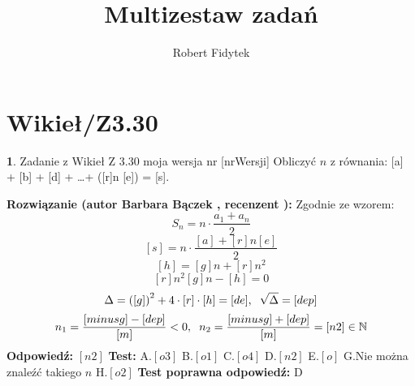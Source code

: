 \documentclass[12pt, a4paper]{article}
\title{Multizestaw zadań}
\author{Robert Fidytek}
\date{}
\theoremstyle{definition} %
\newtheorem{zad}{}
\newcommand{\kategoria}[1]{\section{#1}} %
\newcommand{\zadStart}[1]{\begin{zad}#1\newline} %
\newcommand{\zadStop}{\end{zad}}   %
\newcommand{\rozwStart}[2]{\noindent \textbf{Rozwiązanie (autor #1 , recenzent #2): }\newline} %
\newcommand{\rozwStop}{\newline}                                            %
\newcommand{\odpStart}{\noindent \textbf{Odpowiedź:}\newline}    %
\newcommand{\odpStop}{\newline}                                             %
\newcommand{\testStart}{\noindent \textbf{Test:}\newline} %
\newcommand{\testStop}{\newline} %
\newcommand{\kluczStart}{\noindent \textbf{Test poprawna odpowiedź:}\newline} %
\newcommand{\kluczStop}{\newline} %
\begin{document}
\maketitle


\kategoria{Wikieł/Z3.30}
\zadStart{Zadanie z Wikieł Z 3.30 moja wersja nr [nrWersji]}
Obliczyć $n$ z równania: [a] + [b] + [d] + \ldots + ([r]n [e]) = [s].
\zadStop
\rozwStart{Barbara Bączek}{}
Zgodnie ze wzorem:
$$S_n=n \cdot \frac{a_1+a_n}{2} $$ 
$$[s]= n \cdot \frac{[a] + [r]n [e]}{2}$$
$$[h]=[g]n + [r]n^2$$
$$[r] n^2  [g]n- [h]=0$$
$$\Delta= {([g])}^2 + 4\cdot[r]\cdot[h]= [de], \hspace{0.2 cm} \sqrt{\Delta}=[dep]$$
$$n_1= \frac{[minusg]-[dep]}{[m]}<0 , \hspace{0.2 cm} n_2=\frac{[minusg]+[dep]}{[m]}=[n2] \in \mathbb{N}$$
\rozwStop
\odpStart
$[n2]$
\odpStop
\testStart
A.$[o3]$
B.$[o1]$
C.$[o4]$
D.$[n2]$
E.$[o]$
G.Nie można znaleźć takiego $n$
H.$[o2]$
\testStop
\kluczStart
D
\kluczStop
\end{document}
